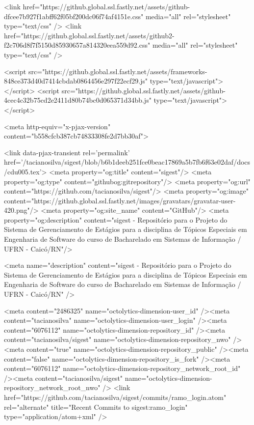     <link href="https://github.global.ssl.fastly.net/assets/github-dfcee7b927f1abff62f05bf200dc06f74af4151e.css" media="all" rel="stylesheet" type="text/css" />
    <link href="https://github.global.ssl.fastly.net/assets/github2-f2c706d8f7f5150d85930657a814320eea559d92.css" media="all" rel="stylesheet" type="text/css" />
    

    

      <script src="https://github.global.ssl.fastly.net/assets/frameworks-848ce373d40d7414cbdab0864456e297f22ecf29.js" type="text/javascript"></script>
      <script src="https://github.global.ssl.fastly.net/assets/github-4cec4c32b75cd2e2411d80b74bc0d065371d34bb.js" type="text/javascript"></script>
      
      <meta http-equiv="x-pjax-version" content="b558cfcb387cb74833308fe2d7bb30af">

        <link data-pjax-transient rel='permalink' href='/tacianosilva/sigest/blob/b6b1deeb251fce0beac17869a5b7fb6f63e02daf/docs/cdu005.tex'>
  <meta property="og:title" content="sigest"/>
  <meta property="og:type" content="githubog:gitrepository"/>
  <meta property="og:url" content="https://github.com/tacianosilva/sigest"/>
  <meta property="og:image" content="https://github.global.ssl.fastly.net/images/gravatars/gravatar-user-420.png"/>
  <meta property="og:site_name" content="GitHub"/>
  <meta property="og:description" content="sigest - Repositório para o Projeto do Sistema de Gerenciamento de Estágios para a disciplina de Tópicos Especiais em Engenharia de Software do curso de Bacharelado em Sistemas de Informação / UFRN - Caicó/RN"/>

  <meta name="description" content="sigest - Repositório para o Projeto do Sistema de Gerenciamento de Estágios para a disciplina de Tópicos Especiais em Engenharia de Software do curso de Bacharelado em Sistemas de Informação / UFRN - Caicó/RN" />

  <meta content="2486325" name="octolytics-dimension-user_id" /><meta content="tacianosilva" name="octolytics-dimension-user_login" /><meta content="6076112" name="octolytics-dimension-repository_id" /><meta content="tacianosilva/sigest" name="octolytics-dimension-repository_nwo" /><meta content="true" name="octolytics-dimension-repository_public" /><meta content="false" name="octolytics-dimension-repository_is_fork" /><meta content="6076112" name="octolytics-dimension-repository_network_root_id" /><meta content="tacianosilva/sigest" name="octolytics-dimension-repository_network_root_nwo" />
  <link href="https://github.com/tacianosilva/sigest/commits/ramo_login.atom" rel="alternate" title="Recent Commits to sigest:ramo_login" type="application/atom+xml" />


